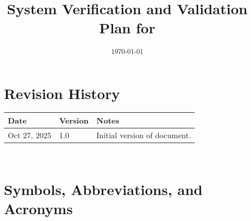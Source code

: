 \documentclass[12pt, titlepage]{article}
\begin{document}
\title{System Verification and Validation Plan for \progname{}}
\author{\authname}
\date{\today}

\maketitle


\section*{Revision History}

\begin{tabularx}{\textwidth}{p{3cm}p{2cm}X}
  \toprule {\bf Date} & {\bf Version} & {\bf Notes}\\
  \midrule
  Oct 27, 2025 & 1.0 & Initial version of document.
  \bottomrule
\end{tabularx}
~\\
\newpage
\tableofcontents
\listoftables
\newpage

\section{Symbols, Abbreviations, and Acronyms}
\end{document}
